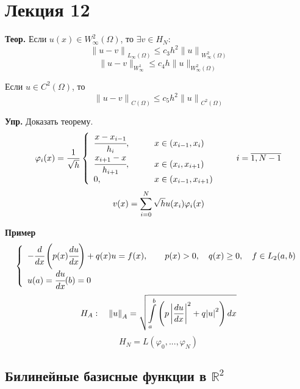 \section{Лекция 12}

\textbf{Теор.} Если $u(x) \in W^2_{\infty} (\Omega)$, то $ \exists v \in H_N$:
\[ {\|u-v\|}_{L_{\infty}(\Omega)} \leq c_3 h^2 {\|u\|}_{W^2_{\infty}(\Omega)}\]
\[ \| u-v \|_{W_{\infty}^1} \leq c_4 h \|u\|_{W^2_{\infty}(\Omega)}\]

Если $u \in C^2(\Omega)$, то
\[ {\|u-v\|}_{C(\Omega)} \leq c_5 h^2 {\|u\|}_{C^2(\Omega)} \]

\textbf{Упр.} Доказать теорему.
\[ \varphi_i(x) = \frac{1}{\sqrt{h}}
\left\{
\begin{array}{ll}
	\cfrac{x-x_{i-1}}{h_i}, \qquad & x \in (x_{i-1}, x_i) \\
	\cfrac{x_{i+1} - x}{h_{i+1}}, \qquad & x \in (x_i, x_{i+1}) \\
	0, \qquad & x \in (x_{i-1}, x_{i+1})
\end{array}
\right. \qquad i = \overline{1, N-1}
\]
\[ v(x) = \sum\limits_{i=0}^{N} \sqrt{h} u(x_i) \varphi_i(x) \]

\textbf{Пример}
\[
\left\{
\begin{array}{l}
	- \cfrac{d}{dx} \left(p(x) \cfrac{du}{dx} \right) + q(x) u = f(x), \qquad p(x) >0, \quad q(x) \geq 0, \quad f \in L_2(a, b) \\
	u(a) = \cfrac{du}{dx}(b) = 0
\end{array}
\right.
\]
\[ H_A: \quad {\|u\|}_A = \sqrt{\int\limits_{a}^{b} \left(p \, {\left|\frac{du}{dx}\right|}^2+q {\left| u \right|}^2 \right) dx} \]
\[ H_N = L (\varphi_0, ..., \varphi_N) \]

\subsection{Билинейные базисные функции в $\mathbb{R}^2$}

